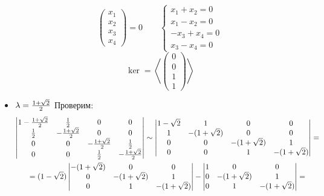 \begin{itemize}
$$\begin{pmatrix}
    	x_1 \\
        x_2 \\
        x_3 \\
        x_4
    \end{pmatrix} = 0 \qquad
    \begin{cases}
    	x_1 + x_2 = 0 \\
        x_1 - x_2 = 0 \\
        -x_3 + x_4 = 0 \\
        x_3 - x_4 = 0
    \end{cases} $$
    $$ \ker = \left\langle
    \begin{pmatrix}
    	0 \\
        0 \\
        1 \\
        1
    \end{pmatrix} \right\rangle $$
    \item $ \lambda = \half[1 + \sqrt2] $
    Проверим:
    \begin{multline*}
        \begin{vmatrix}
            1 - \half[1 + \sqrt{2}] & \half & 0 & 0 \\
            \half & -\half[1 + \sqrt{2}] & 0 & 0 \\
            0 & 0 & -\half[1 + \sqrt{2}] & \half \\
            0 & 0 & \half & -\half[1 + \sqrt{2}]
        \end{vmatrix} \sim
        \begin{vmatrix}
        	1 - \sqrt2 & 1 & 0 & 0 \\
            1 & -(1 + \sqrt2) & 0 & 0 \\
            0 & 0 & -(1 + \sqrt2) & 1 \\
            0 & 0 & 1 & -(1 + \sqrt2)
        \end{vmatrix} = \\
        = (1 - \sqrt2)
        \begin{vmatrix}
        	-(1 + \sqrt2) & 0 & 0 \\
            0 & -(1 + \sqrt2) & 1 \\
            0 & 1 & -(1 + \sqrt2)
        \end{vmatrix} -
        \begin{vmatrix}
        	1 & 0 & 0 \\
            0 & -(1 + \sqrt2) & 1 \\
            0 & 1 & -(1 + \sqrt2)
        \end{vmatrix} = \\

\end{multline*}
\end{itemize}
